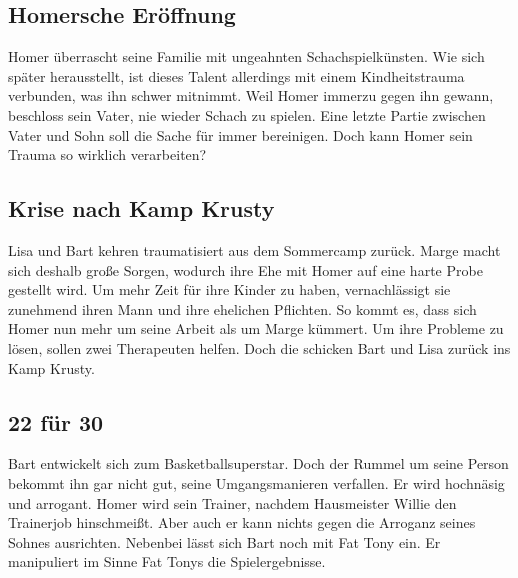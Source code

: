 
\subsection{Homersche Eröffnung}\label{WABF08}
Homer überrascht seine Familie mit ungeahnten Schachspielkünsten. Wie sich später herausstellt, ist dieses Talent allerdings mit einem Kindheitstrauma verbunden, was ihn schwer mitnimmt. Weil Homer immerzu gegen ihn gewann, beschloss sein Vater, nie wieder Schach zu spielen. Eine letzte Partie zwischen Vater und Sohn soll die Sache für immer bereinigen. Doch kann Homer sein Trauma so wirklich verarbeiten?


\subsection{Krise nach Kamp Krusty}
Lisa und Bart kehren traumatisiert aus dem Sommercamp zurück. Marge macht sich deshalb große Sorgen, wodurch ihre Ehe mit Homer auf eine harte Probe gestellt wird. Um mehr Zeit für ihre Kinder zu haben, vernachlässigt sie zunehmend ihren Mann und ihre ehelichen Pflichten. So kommt es, dass sich Homer nun mehr um seine Arbeit als um Marge kümmert. Um ihre Probleme zu lösen, sollen zwei Therapeuten helfen. Doch die schicken Bart und Lisa zurück ins Kamp Krusty.


\subsection{22 für 30}\label{WABF10}
Bart entwickelt sich zum Basketballsuperstar. Doch der Rummel um seine Person bekommt ihn gar nicht gut, seine Umgangsmanieren verfallen. Er wird hochnäsig und arrogant. Homer wird sein Trainer, nachdem Hausmeister Willie den Trainerjob hinschmeißt. Aber auch er kann nichts gegen die Arroganz seines Sohnes ausrichten. Nebenbei lässt sich Bart noch mit Fat Tony ein. Er manipuliert im Sinne Fat Tonys die Spielergebnisse.

